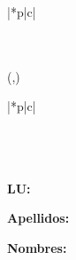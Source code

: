 {{{\begin{textblock}{\anchodegrilla}
\begin{tabular}{|*{\value{total}}{p{\anchodecasilla}|}c|}
          \hline
          \primerafila\\
          \hline
          \tercerafila\\
          \tercerafila\\
          \hline
        \end{tabular}
      \end{textblock}
    }
    {%
      \begin{textblock}{\anchodegrilla}(\izquierda,\abajo)
        \begin{tabular}{|*{\value{total}}{p{\anchodecasilla}|}c|}
          \hline
          \primerafila\\
          \rayitas
          \segundafila\\
          \hline
          \tercerafila\\
          \tercerafila\\
          \hline
        \end{tabular}
      \end{textblock}
    }
  }%
  \vspace{0.4cm}
  \textbf{LU:}
  
  \textbf{Apellidos:}
  
  \textbf{Nombres:}
  \vspace{0.5cm}
}

{%
  \usepackage[top=1cm,bottom=2cm,left=1cm,right=1cm]{geometry}%
  \usepackage{color}%
  \newcommand{\tocarEspacios}{%
    \addtolength{\leftskip}{2.5em}%
    \addtolength{\parindent}{-3em}%
  }%
}


\newcommand{\ent}{\ensuremath{\mathbb{Z}}}
\newcommand{\float}{\ensuremath{\mathbb{R}}}
\newcommand{\bool}{\ensuremath{\mathsf{Bool}}}
\newcommand{\True}{\ensuremath{\mathrm{True}}}
\newcommand{\False}{\ensuremath{\mathrm{False}}}
\newcommand{\Then}{\ensuremath{\rightarrow}}
\newcommand{\Iff}{\ensuremath{\leftrightarrow}}
\newcommand{\implica}{\ensuremath{\longrightarrow}}
\newcommand{\IfThenElse}[3]{\ensuremath{\mathsf{if}\ #1\ \mathsf{then}\ #2\ \mathsf{else}\ #3}}

